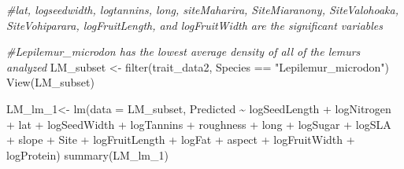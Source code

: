 \documentclass[
  12pt,
]{article}
\newenvironment{Shaded}{\begin{snugshade}}{\end{snugshade}}
\newcommand{\AttributeTok}[1]{\textcolor[rgb]{0.77,0.63,0.00}{#1}}
\newcommand{\CommentTok}[1]{\textcolor[rgb]{0.56,0.35,0.01}{\textit{#1}}}
\newcommand{\FunctionTok}[1]{\textcolor[rgb]{0.00,0.00,0.00}{#1}}
\newcommand{\NormalTok}[1]{#1}
\newcommand{\OtherTok}[1]{\textcolor[rgb]{0.56,0.35,0.01}{#1}}
\newcommand{\SpecialCharTok}[1]{\textcolor[rgb]{0.00,0.00,0.00}{#1}}
\newcommand{\StringTok}[1]{\textcolor[rgb]{0.31,0.60,0.02}{#1}}
\begin{document}
\begin{Shaded}
\begin{Highlighting}[]
\CommentTok{\#lat, logseedwidth, logtannins, long, siteMaharira, SiteMiaranony, SiteValohoaka, SiteVohiparara, logFruitLength, and logFruitWidth are the significant variables}

\CommentTok{\#Lepilemur\_microdon has the lowest average density of all of the lemurs analyzed}
\NormalTok{LM\_subset }\OtherTok{\textless{}{-}} \FunctionTok{filter}\NormalTok{(trait\_data2, Species }\SpecialCharTok{==} \StringTok{"Lepilemur\_microdon"}\NormalTok{)}
\FunctionTok{View}\NormalTok{(LM\_subset)}

\NormalTok{LM\_lm\_1}\OtherTok{\textless{}{-}} \FunctionTok{lm}\NormalTok{(}\AttributeTok{data =}\NormalTok{ LM\_subset, Predicted }\SpecialCharTok{\textasciitilde{}}\NormalTok{ logSeedLength }\SpecialCharTok{+}\NormalTok{ logNitrogen }\SpecialCharTok{+}\NormalTok{ lat }\SpecialCharTok{+}\NormalTok{ logSeedWidth }\SpecialCharTok{+}\NormalTok{ logTannins }\SpecialCharTok{+}\NormalTok{ roughness }\SpecialCharTok{+}\NormalTok{ long }\SpecialCharTok{+}\NormalTok{ logSugar }\SpecialCharTok{+}\NormalTok{ logSLA }\SpecialCharTok{+}\NormalTok{ slope }\SpecialCharTok{+}\NormalTok{ Site }\SpecialCharTok{+}\NormalTok{ logFruitLength }\SpecialCharTok{+}\NormalTok{ logFat }\SpecialCharTok{+}\NormalTok{ aspect }\SpecialCharTok{+}\NormalTok{ logFruitWidth }\SpecialCharTok{+}\NormalTok{ logProtein)}
\FunctionTok{summary}\NormalTok{(LM\_lm\_1)}
\end{Highlighting}
\end{Shaded}
\end{document}
